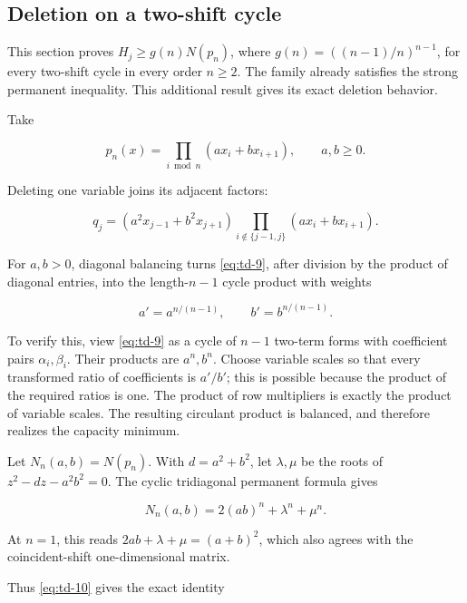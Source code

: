 \documentclass[11pt,a4paper]{article}
\theoremstyle{definition}
\theoremstyle{remark}
\begin{document}
\subsection{Deletion on a two-shift
cycle}\label{deletion-deletion-on-a-two-shift-cycle}

This section proves \(H_j\ge g(n)N(p_n)\), where
\(g(n)=((n-1)/n)^{n-1}\), for every two-shift cycle in every order
\(n\ge2\). The family already satisfies the strong permanent inequality.
This additional result gives its exact deletion behavior.

Take

\[
p_n(x)=\prod_{i\bmod n}(a x_i+b x_{i+1}),\qquad a,b\ge0.
\]

Deleting one variable joins its adjacent factors:

\begin{equation}\label{eq:td-9}
q_j=(a^2x_{j-1}+b^2x_{j+1})
\prod_{i\notin\{j-1,j\}}(a x_i+b x_{i+1}).
\end{equation}

For \(a,b>0\), diagonal balancing turns \eqref{eq:td-9}, after division by the
product of diagonal entries, into the length-\(n-1\) cycle product with
weights

\begin{equation}\label{eq:td-10}
a'=a^{n/(n-1)},\qquad b'=b^{n/(n-1)}.
\end{equation}

To verify this, view \eqref{eq:td-9} as a cycle of \(n-1\) two-term forms with
coefficient pairs \(\alpha_i,\beta_i\). Their products are \(a^n,b^n\).
Choose variable scales so that every transformed ratio of coefficients
is \(a'/b'\); this is possible because the product of the required
ratios is one. The product of row multipliers is exactly the product of
variable scales. The resulting circulant product is balanced, and
therefore realizes the capacity minimum.

Let \(N_n(a,b)=N(p_n)\). With \(d=a^2+b^2\), let \(\lambda,\mu\) be the
roots of \(z^2-dz-a^2b^2=0\). The cyclic tridiagonal permanent formula
gives

\begin{equation}\label{eq:td-11}
N_n(a,b)=2(ab)^n+\lambda^n+\mu^n.
\end{equation}

At \(n=1\), this reads \(2ab+\lambda+\mu=(a+b)^2\), which also agrees
with the coincident-shift one-dimensional matrix.

Thus \eqref{eq:td-10} gives the exact identity
\end{document}
